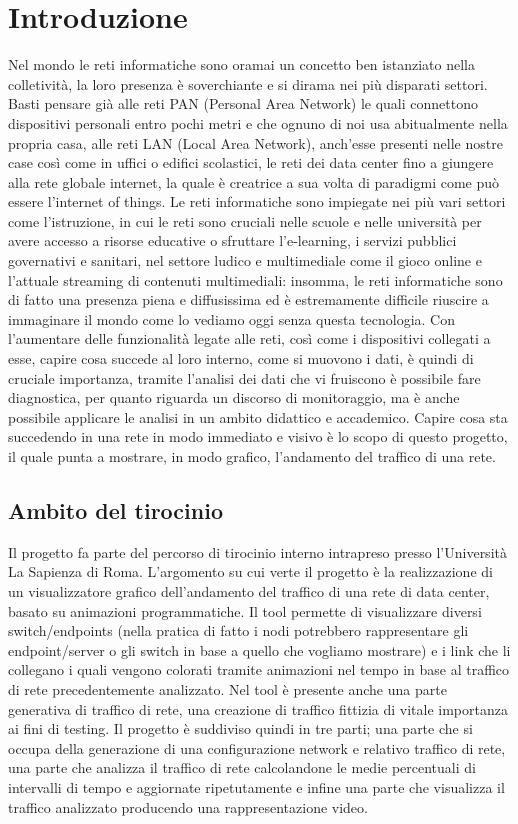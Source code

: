 \documentclass[binding=0.6cm]{sapthesis}
\begin{document}
\chapter{Introduzione}
Nel mondo le reti informatiche sono oramai un concetto ben istanziato 
nella colletività, la loro presenza è soverchiante e si dirama nei più disparati settori.
Basti pensare già alle  reti PAN (Personal Area Network) le quali connettono dispositivi
personali entro pochi metri e che ognuno di noi usa abitualmente nella propria casa, 
alle reti LAN (Local Area Network), 
anch'esse presenti
nelle nostre case così come in uffici o edifici scolastici, le reti dei data center 
fino a giungere alla rete globale internet, la quale è creatrice a sua volta di paradigmi come
può essere l'internet of things. Le reti informatiche sono impiegate nei più vari 
settori come l'istruzione, in cui le reti
sono cruciali nelle scuole e nelle università per avere accesso a risorse educative o sfruttare l'e-learning, i servizi
pubblici governativi e sanitari, nel settore ludico e multimediale come il gioco online e l'attuale
streaming di contenuti multimediali: insomma, le reti informatiche sono di fatto una presenza piena e diffusissima
ed è estremamente difficile riuscire a immaginare il mondo come lo vediamo oggi senza questa tecnologia.
Con l'aumentare delle funzionalità legate alle reti, così come i dispositivi collegati a esse, capire cosa succede al
loro interno, come si muovono i dati, è quindi di cruciale importanza, tramite l'analisi dei dati che vi fruiscono è possibile fare diagnostica, per quanto
riguarda un discorso di monitoraggio, ma è anche possibile applicare le analisi in un ambito didattico e accademico.
Capire cosa sta succedendo in una rete in modo immediato e visivo è lo scopo di questo progetto, il quale punta a mostrare,
in modo grafico, l'andamento del traffico di una rete.
\section{Ambito del tirocinio}
Il progetto fa parte del percorso di tirocinio interno intrapreso presso l'Università La Sapienza di Roma. L'argomento su cui verte il progetto
è la realizzazione di un visualizzatore grafico dell'andamento del traffico di una rete di data center, basato
su animazioni programmatiche. Il tool permette di visualizzare diversi switch/endpoints (nella pratica di fatto i nodi potrebbero rappresentare gli endpoint/server o gli switch in base a quello che vogliamo mostrare) e i link
che li collegano i quali vengono colorati tramite animazioni nel tempo in base al traffico di 
rete precedentemente analizzato. Nel tool è presente anche una parte generativa di traffico di rete,
una creazione di traffico fittizia di vitale importanza ai fini di testing. Il progetto è suddiviso quindi in tre parti; una parte
che si occupa della generazione di una configurazione network e relativo traffico di rete, 
una parte che analizza il traffico di rete
calcolandone le medie percentuali di intervalli di tempo e aggiornate ripetutamente e infine 
una parte che visualizza il traffico analizzato producendo una rappresentazione video.
\end{document}
